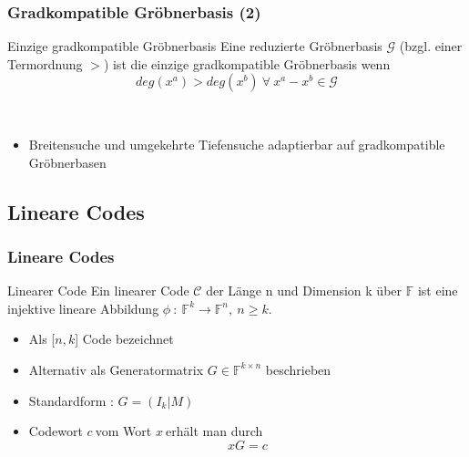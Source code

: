 \documentclass{beamer}
\begin{document}

\begin{frame}[<+->]
\frametitle{Gradkompatible Gröbnerbasis (2)}


\begin{block}{Einzige gradkompatible Gröbnerbasis}
Eine reduzierte Gröbnerbasis $\mathcal{G}$ (bzgl. einer Termordnung $>$) ist die einzige gradkompatible Gröbnerbasis wenn 
\[ deg(x^{a}) > deg(x^{b})~ \forall~ x^{a}-x^{b}\in \mathcal{G} \] 

\end{block}
~\\
\begin{itemize}
\item Breitensuche und umgekehrte Tiefensuche adaptierbar auf gradkompatible Gröbnerbasen
\end{itemize}

\end{frame}


\subsection{Lineare Codes}

\begin{frame}[<+->]
\frametitle{Lineare Codes}


\begin{block}{Linearer Code}
Ein linearer Code $\mathcal{C}$  der Länge n und Dimension k über $\mathbb{F}$ ist eine injektive lineare Abbildung  $\phi~:~\mathbb{F}^{k} \rightarrow \mathbb{F}^{n},~n\geq k $.
\end{block}

\begin{itemize}
\item Als [$n,k$] Code bezeichnet
\item Alternativ als Generatormatrix $G \in \mathbb{F}^{k \times n}$ beschrieben 
~\\
\item Standardform : $G = (I_{k}| M)$ %
\item Codewort $c~$vom Wort $x~$erhält man durch 
\[
     xG = c 
 \]
\end{itemize}

\end{frame}
\end{document}
